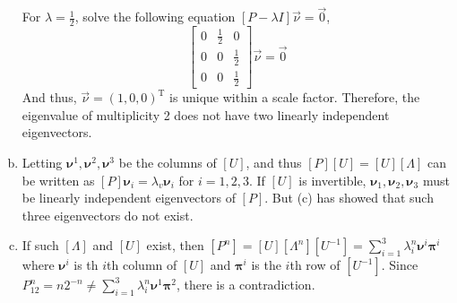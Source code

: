 \documentclass{article}
\begin{document}
\begin{enumerate}[(a)]
        For $\lambda=\frac{1}{2}$, solve the following equation $[P-\lambda I]\vec{\nu}=\vec{0}$,
        \begin{equation*}
            \begin{bmatrix}
                0 & \frac{1}{2} & 0\\
                0 & 0 & \frac{1}{2}\\
                0 & 0 & \frac{1}{2}
            \end{bmatrix}\vec{\nu}=\vec{0}
        \end{equation*}
        And thus, $\vec{\nu}=(1,0,0)^\text{T}$ is unique within a scale factor. Therefore,  the eigenvalue of multiplicity 2 does not have two linearly independent eigenvectors.
        \item Letting $\bm{\nu}^1,\bm{\nu}^2,\bm{\nu}^3$ be the columns of $[U]$, and thus $[P][U]=[U][\Lambda]$ can be written as  $[P]\bm{\nu}_i=\lambda_v\bm{\nu}_i$ for $i=1,2,3$. If $[U]$ is invertible, $\bm{\nu}_1,\bm{\nu}_2,\bm{\nu}_3$ must be linearly independent eigenvectors of $[P]$. But (c) has showed that such three eigenvectors do not exist.
        \item If such $[\Lambda]$ and $[U]$ exist, then $[P^n]=[U][\Lambda^n][U^{-1}]=\sum_{i=1}^3\lambda^n_i\bm{\nu}^i\bm{\pi}^i$ where $\bm{\nu}^i$ is th $i$th column of $[U]$ and $\bm{\pi}^i$ is the $i$th row of $[U^{-1}]$. Since $P^n_{12}=n2^{-n}\neq\sum_{i=1}^3\lambda^n_i\bm{\nu}^1\bm{\pi}^2$, there is a contradiction.
    \end{enumerate} 
\end{document}
